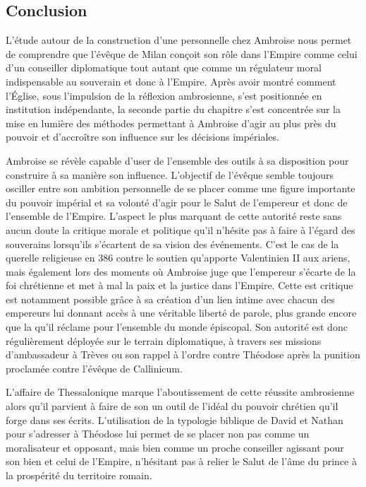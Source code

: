 \subsection*{Conclusion}

L'étude autour de la construction d'une  personnelle chez Ambroise nous permet de comprendre que l'évêque de Milan conçoit son rôle dans l'Empire comme celui d'un conseiller diplomatique tout autant que comme un régulateur moral indispensable au souverain et donc à l'Empire. Après avoir montré comment l'Église, sous l'impulsion de la réflexion ambrosienne, s'est positionnée en institution indépendante, la seconde partie du chapitre s'est concentrée sur la mise en lumière des méthodes permettant à Ambroise d'agir au plus près du pouvoir et d'accroître son influence sur les décisions impériales.

\bigskip

Ambroise se révèle capable d'user de l'ensemble des outils à sa disposition pour construire à sa manière son influence. L'objectif de l'évêque semble toujours osciller entre son ambition personnelle de se placer comme une figure importante du pouvoir impérial et sa volonté d'agir pour le Salut de l'empereur et donc de l'ensemble de l'Empire. L'aspect le plus marquant de cette autorité reste sans aucun doute la critique morale et politique qu'il n'hésite pas à faire à l'égard des souverains lorsqu'ils s'écartent de sa vision des événements. C'est le cas de la querelle religieuse en 386 contre le soutien qu'apporte Valentinien II aux ariens, mais également lors des moments où Ambroise juge que l'empereur s'écarte de la foi chrétienne et met à mal la paix et la justice dans l'Empire. Cette est critique est notamment possible grâce à sa création d'un lien intime avec chacun des empereurs lui donnant accès à une véritable liberté de parole, plus grande encore que la  qu'il réclame pour l'ensemble du monde épiscopal. Son autorité est donc régulièrement déployée sur le terrain diplomatique, à travers ses missions d'ambassadeur à Trèves ou son rappel à l'ordre contre Théodose après la punition proclamée contre l'évêque de Callinicum.

\bigskip

L'affaire de Thessalonique marque l'aboutissement de cette réussite ambrosienne alors qu'il parvient à faire de son  un outil de l'idéal du pouvoir chrétien qu'il forge dans ses écrits. L'utilisation de la typologie biblique de David et Nathan pour s'adresser à Théodose lui permet de se placer non pas comme un moralisateur et opposant, mais bien comme un proche conseiller agissant pour son bien et celui de l'Empire, n'hésitant pas à relier le Salut de l'âme du prince à la prospérité du territoire romain.
